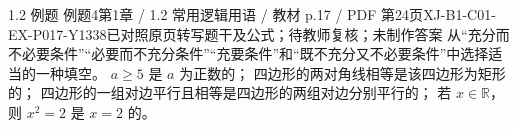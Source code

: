\par\noindent\begin{minipage}{\linewidth}
\begin{bankitem}{1.2 例题 例题4}{第1章 / 1.2 常用逻辑用语 / 教材 p.17 / PDF 第24页}{XJ-B1-C01-EX-P017-Y1338}{已对照原页转写题干及公式；待教师复核；未制作答案}
从“充分而不必要条件”“必要而不充分条件”“充要条件”和“既不充分又不必要条件”中选择适当的一种填空。
$a\ge5$ 是 $a$ 为正数的\blank；
四边形的两对角线相等是该四边形为矩形的\blank；
四边形的一组对边平行且相等是四边形的两组对边分别平行的\blank；
若 $x\in\mathbb R$，则 $x^2=2$ 是 $x=2$ 的\blank。
\end{bankitem}
\end{minipage}\par\medskip
